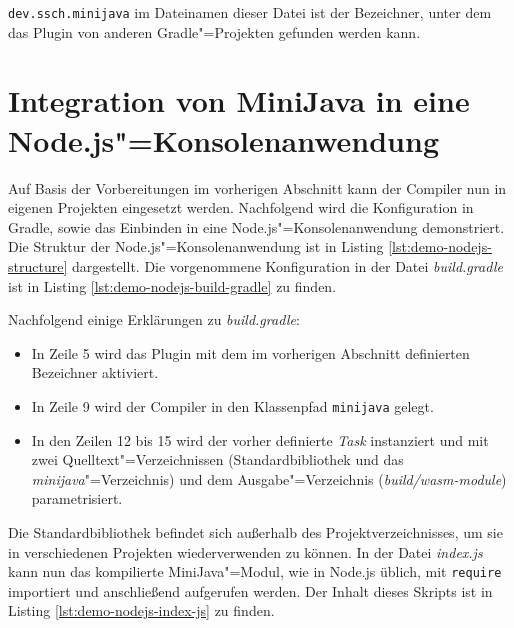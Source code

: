 

\lstinline{dev.ssch.minijava} im Dateinamen dieser Datei ist der Bezeichner, unter dem das Plugin von anderen Gradle"=Projekten gefunden werden kann.

\pagebreak
\section{Integration von MiniJava in eine Node.js"=Konsolenanwendung}
\label{sec:NodeJSExample}

Auf Basis der Vorbereitungen im vorherigen Abschnitt kann der Compiler nun in eigenen Projekten eingesetzt werden. Nachfolgend wird die Konfiguration in Gradle, sowie das Einbinden in eine Node.js"=Konsolenanwendung demonstriert. Die Struktur der Node.js"=Konsolenanwendung ist in Listing \ref{lst:demo-nodejs-structure} dargestellt. Die vorgenommene Konfiguration in der Datei \emph{build.gradle} ist in Listing \ref{lst:demo-nodejs-build-gradle} zu finden.





Nachfolgend einige Erklärungen zu \emph{build.gradle}:
\begin{itemize}
    \item In Zeile 5 wird das Plugin mit dem im vorherigen Abschnitt definierten Bezeichner aktiviert.
    \item In Zeile 9 wird der Compiler in den Klassenpfad \lstinline{minijava} gelegt.
    \item In den Zeilen 12 bis 15 wird der vorher definierte \emph{Task} instanziert und mit zwei Quelltext"=Verzeichnissen (Standardbibliothek und das \emph{minijava}"=Verzeichnis) und dem Ausgabe"=Verzeichnis (\emph{build/wasm-module}) parametrisiert.
\end{itemize}

Die Standardbibliothek befindet sich außerhalb des Projektverzeichnisses, um sie in verschiedenen Projekten wiederverwenden zu können. In der Datei \emph{index.js} kann nun das kompilierte MiniJava"=Modul, wie in Node.js üblich, mit \lstinline{require} importiert und anschließend aufgerufen werden. Der Inhalt dieses Skripts ist in Listing \ref{lst:demo-nodejs-index-js} zu finden.

